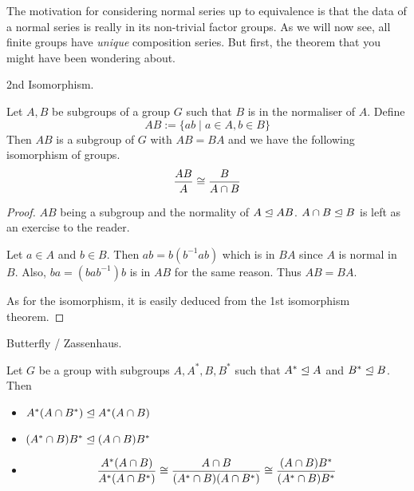\documentclass[../../book.tex]{subfiles}
\begin{document}
\begin{rmk}
    
    The motivation for considering normal series up to equivalence is that
    the data of a normal series is really in its non-trivial factor groups.
    As we will now see, all finite groups have \emph{unique} composition series.
    But first, the theorem that you might have been wondering about.
    
\end{rmk}
\begin{thm} 2nd Isomorphism.
    
    Let $A, B$ be subgroups of a group $G$ such that
    $B$ is in the normaliser of $A$. 
    Define \[
        AB := \{ ab \mid a \in A, b \in B\}
    \]
    Then $AB$ is a subgroup of $G$ with $AB = BA$
    and we have the following isomorphism of groups. 
    \[
            \frac{AB}{A} \cong \frac{B}{A \cap B}
    \]
    
\end{thm}
\begin{proof}
    
    $AB$ being a subgroup and 
    the normality of $A \trianglelefteq AB$. $A \cap B \trianglelefteq B$
    is left as an exercise to the reader.
    
    Let $a \in A$ and $b \in B$. 
    Then $ab = b (b^{-1}ab)$ which is in $BA$ since $A$ is normal in $B$. 
    Also, $ba = (bab^{-1}) b$ is in $AB$ for the same reason.
    Thus $AB = BA$. 
    
    As for the isomorphism, it is easily deduced from the 1st isomorphism theorem.
    
\end{proof}
\begin{lem} Butterfly / Zassenhaus.
    
    Let $G$ be a group with subgroups $A, A^*, B, B^*$ such that 
    $A^* \trianglelefteq A$ and $B^* \trianglelefteq B$. 
    Then \begin{itemize}
        \item $A^* (A \cap B^*) \trianglelefteq A^* (A \cap B)$
        \item $(A^* \cap B) B^* \trianglelefteq (A \cap B) B^*$
        \item \[
            \frac {A^* (A \cap B)}{A^* (A \cap B^*)}
            \cong \frac{A \cap B}{(A^* \cap B)(A \cap B^*)}
            \cong \frac{(A \cap B)B^*}{(A^*\cap B)B^*}
        \]
    \end{itemize}
\end{lem}
\end{document}
